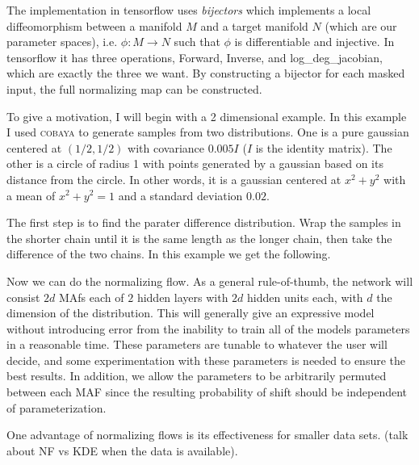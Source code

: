 The implementation in tensorflow uses \textit{bijectors} which implements a local diffeomorphism between a manifold $M$ and a target manifold $N$ (which are our parameter spaces), i.e. $\phi:M\rightarrow N$ such that $\phi$ is differentiable and injective. In tensorflow it has three operations, Forward, Inverse, and log\_deg\_jacobian, which are exactly the three we want. By constructing a bijector for each masked input, the full normalizing map can be constructed.

To give a motivation, I will begin with a 2 dimensional example. In this example I used \textsc{cobaya} to generate samples from two distributions. One is a pure gaussian centered at $(1/2,1/2)$ with covariance $0.005 I$  ($I$ is the identity matrix). The other is a circle of radius 1 with points generated by a gaussian based on its distance from the circle. In other words, it is a gaussian centered at $x^2+y^2$ with a mean of $x^2+y^2=1$ and a standard deviation $0.02$.

The first step is to find the parater difference distribution. Wrap the samples in the shorter chain until it is the same length as the longer chain, then take the difference of the two chains. In this example we get the following.

Now we can do the normalizing flow. As a general rule-of-thumb, the network will consist $2d$ MAfs each of $2$ hidden layers with $2d$ hidden units each, with $d$ the dimension of the distribution.
This will generally give an expressive model without introducing error from the inability to train all of the models parameters in a reasonable time. 
These parameters are tunable to whatever the user will decide, and some experimentation with these parameters is needed to ensure the best results.
In addition, we allow the parameters to be arbitrarily permuted between each MAF since the resulting probability of shift should be independent of parameterization.

One advantage of normalizing flows is its effectiveness for smaller data sets. (talk about NF vs KDE when the data is available).
